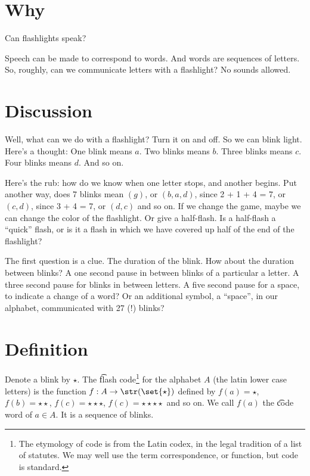 

\section*{Why}

Can flashlights speak?

Speech can be made to correspond to words.
And words are sequences of letters.
So, roughly, can we communicate letters with a flashlight?
No sounds allowed.

\section*{Discussion}

Well, what can we do with a flashlight?
Turn it on and off.
So we can blink light.
Here's a thought:
One blink means $a$.
Two blinks means $b$.
Three blinks means $c$.
Four blinks means $d$.
And so on.

Here's the rub: how do we know when one letter stops, and another begins.
Put another way, does 7 blinks mean $(g)$, or $(b, a, d)$, since 2 + 1 + 4 = 7, or $(c, d)$, since 3 + 4 = 7, or $(d, c)$ and so on.
If we change the game, maybe we can change the color of the flashlight.
Or give a half-flash.
Is a half-flash a ``quick'' flash, or is it a flash in which we have covered up half of the end of the flashlight?

The first question is a clue.
The duration of the blink.
How about the duration between blinks?
A one second pause in between blinks of a particular a letter.
A three second pause for blinks in between letters.
A five second pause for a space, to indicate a change of a word?
Or an additional symbol, a ``space'', in our alphabet, communicated with 27 (!) blinks?

\newcommand{\blink}{\star}
\newcommand{\pause}{\square}
\section*{Definition}

Denote a blink by $\blink$.
The \t{flash code}\footnote{The etymology of code is from the Latin codex, in the legal tradition of a list of statutes. We may well use the term correspondence, or function, but code is standard.}
for the alphabet $A$ (the latin lower case letters) is the function $f: A \to \str(\set{\blink})$ defined by $f(a) = \blink$, $f(b) = \blink\blink$, $f(c) = \blink\blink\blink$, $f(c) = \blink\blink\blink\blink$ and so on.
We call $f(a)$ the \t{code word} of $a \in A$.
It is a sequence of blinks.

